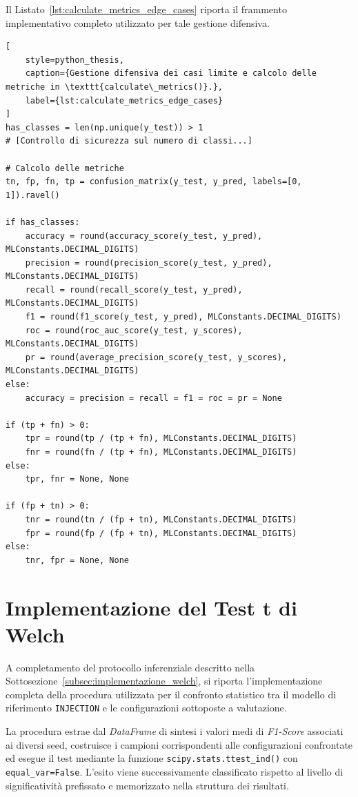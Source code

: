 Il Listato~\ref{lst:calculate_metrics_edge_cases} riporta il frammento
implementativo completo utilizzato per tale gestione difensiva.

\newpage

\begin{lstlisting}[
    style=python_thesis,
    caption={Gestione difensiva dei casi limite e calcolo delle metriche in \texttt{calculate\_metrics()}.},
    label={lst:calculate_metrics_edge_cases}
]
has_classes = len(np.unique(y_test)) > 1
# [Controllo di sicurezza sul numero di classi...]

# Calcolo delle metriche
tn, fp, fn, tp = confusion_matrix(y_test, y_pred, labels=[0, 1]).ravel()

if has_classes:
    accuracy = round(accuracy_score(y_test, y_pred), MLConstants.DECIMAL_DIGITS)
    precision = round(precision_score(y_test, y_pred), MLConstants.DECIMAL_DIGITS)
    recall = round(recall_score(y_test, y_pred), MLConstants.DECIMAL_DIGITS)
    f1 = round(f1_score(y_test, y_pred), MLConstants.DECIMAL_DIGITS)
    roc = round(roc_auc_score(y_test, y_scores), MLConstants.DECIMAL_DIGITS)
    pr = round(average_precision_score(y_test, y_scores), MLConstants.DECIMAL_DIGITS)
else:
    accuracy = precision = recall = f1 = roc = pr = None
    
if (tp + fn) > 0:
    tpr = round(tp / (tp + fn), MLConstants.DECIMAL_DIGITS)
    fnr = round(fn / (tp + fn), MLConstants.DECIMAL_DIGITS)
else:
    tpr, fnr = None, None

if (fp + tn) > 0: 
    tnr = round(tn / (fp + tn), MLConstants.DECIMAL_DIGITS)
    fpr = round(fp / (fp + tn), MLConstants.DECIMAL_DIGITS)
else:
    tnr, fpr = None, None
\end{lstlisting}



\section{Implementazione del Test t di Welch}
\label{app:welch_implementation}

A completamento del protocollo inferenziale descritto nella Sottosezione~\ref{subsec:implementazione_welch}, si riporta l'implementazione completa della procedura utilizzata per il confronto statistico tra il modello di riferimento \texttt{INJECTION} e le configurazioni sottoposte a valutazione.

La procedura estrae dal \textit{DataFrame} di sintesi i valori medi di \textit{F1-Score} associati ai diversi seed, costruisce i campioni corrispondenti alle configurazioni confrontate ed esegue il test mediante la funzione \texttt{scipy.stats.ttest\_ind()} con \texttt{equal\_var=False}. 
L'esito viene successivamente classificato rispetto al livello di significatività prefissato e memorizzato nella struttura dei risultati.

